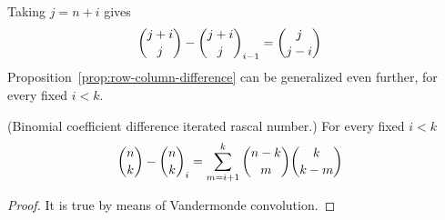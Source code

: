 Taking $j=n+i$ gives
\begin{align*}
    \binom{j+i}{j} - \binom{j+i}{j}_{i-1} &= \binom{j}{j-i}
\end{align*}
Proposition~\eqref{prop:row-column-difference} can be generalized even further, for every fixed $i < k$.
\begin{proposition}
(Binomial coefficient difference iterated rascal number.)
    For every fixed $i < k$
    \label{prop:row-column-difference-general}
    \begin{align*}
        \binom{n}{k} - \binom{n}{k}_{i} &= \sum_{m=i+1}^{k} \binom{n-k}{m} \binom{k}{k-m}
    \end{align*}
    \begin{proof}
        It is true by means of Vandermonde convolution.
    \end{proof}
\end{proposition}

